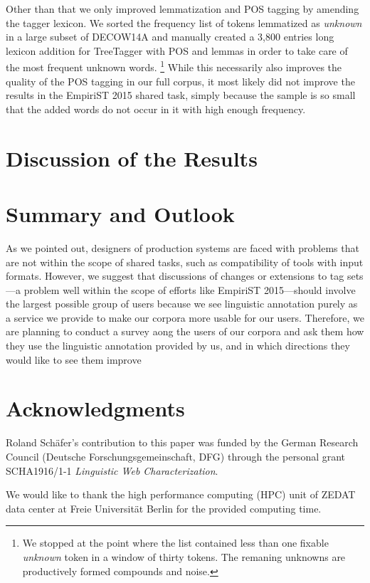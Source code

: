 \documentclass[11pt]{article}
\begin{document}
Other than that we only improved lemmatization and POS tagging by amending the tagger lexicon.
We sorted the frequency list of tokens lemmatized as \textit{unknown} in a large subset of DECOW14A and manually created a 3,800 entries long lexicon addition for TreeTagger with POS and lemmas in order to take care of the most frequent unknown words.%
\footnote{We stopped at the point where the list contained less than one fixable \textit{unknown} token in a window of thirty tokens.
The remaning unknowns are productively formed compounds and noise.}
While this necessarily also improves the quality of the POS tagging in our full corpus, it most likely did not improve the results in the EmpiriST 2015 shared task, simply because the sample is so small that the added words do not occur in it with high enough frequency.

\section{Discussion of the Results}
\label{sec:discussionresults}

\section{Summary and Outlook}
\label{sec:problemsoutlook}

As we pointed out, designers of production systems are faced with problems that are not within the scope of shared tasks, such as compatibility of tools with input formats.
However, we suggest that discussions of changes or extensions to tag sets---a problem well within the scope of efforts like EmpiriST 2015---should involve the largest possible group of users because we see linguistic annotation purely as a service we provide to make our corpora more usable for our users.
Therefore, we are planning to conduct a survey aong the users of our corpora and ask them how they use the linguistic annotation provided by us, and in which directions they would like to see them improve 

\section*{Acknowledgments}

Roland Schäfer's contribution to this paper was funded by the German Research Council (Deutsche Forschungsgemeinschaft, DFG) through the personal grant SCHA1916/1-1 \textit{Linguistic Web Characterization}.

We would like to thank the high performance computing (HPC) unit of ZEDAT data center at Freie Universität Berlin for the provided computing time.




\end{document}
